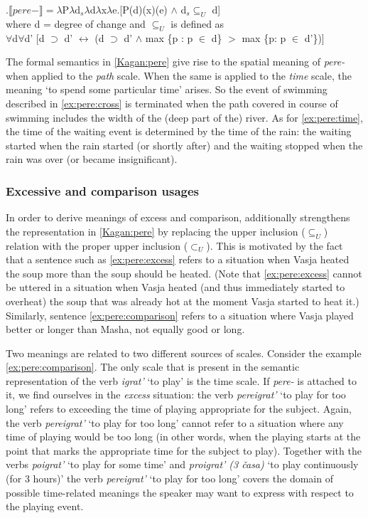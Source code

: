\ex.\label{Kagan:pere}$\llbracket pere- \rrbracket = \lambda$P$\lambda$d$_s\lambda$d$\lambda$x$\lambda$e.[P(d)(x)(e) $\wedge$ d$_s \subseteq _U$ d]\\
where d = degree of change \citep{KennedyLevin:02} and $\subseteq _U$ is defined as\\
$\forall$d$\forall$d' [d $\supset$ d' $\leftrightarrow$ (d $\supset$ d' $\wedge$ max \{p : p $\in$ d\} $>$ max \{p: p $\in$ d'\})]\\

The formal semantics in \ref{Kagan:pere} give rise to the spatial meaning of \textit{pere-} when applied to the \textit{path} scale. When the same is applied to the \textit{time} scale, the meaning `to spend some particular time' arises. So the event of swimming described in \ref{ex:pere:cross} is terminated when the path covered in course of swimming includes the width of the (deep part of the) river. As for \ref{ex:pere:time}, the time of the waiting event is determined by the time of the rain: the waiting started when the rain started (or shortly after) and the waiting stopped when the rain was over (or became insignificant).

\subsubsection{Excessive and comparison usages}
In order to derive meanings of excess and comparison, \citet[133]{Kagan:book} additionally strengthens the representation in \ref{Kagan:pere} by replacing the upper inclusion ($\subseteq _U$) relation with the proper upper inclusion ($\subset _U$). This is motivated by the fact that a sentence such as \ref{ex:pere:excess} refers to a situation when Vasja heated the soup more than the soup should be heated. (Note that \ref{ex:pere:excess} cannot be uttered in a situation when Vasja heated (and thus immediately started to overheat) the soup that was already hot at the moment Vasja started to heat it.) Similarly, sentence \ref{ex:pere:comparison} refers to a situation where Vasja played better or longer than Masha, not equally good or long.

Two meanings are related to two different sources of scales. Consider the example \ref{ex:pere:comparison}. The only scale that is present in the semantic representation of the verb \textit{igrat'} `to play' is the time scale. If \textit{pere-} is attached to it, we find ourselves in the \textit{excess} situation: the verb \textit{pereigrat'} `to play for too long' refers to exceeding the time of playing appropriate for the subject. Again, the verb \textit{pereigrat'} `to play for too long' cannot refer to a situation where any time of playing would be too long (in other words, when the playing starts at the point that marks the appropriate time for the subject to play). Together with the verbs \textit{poigrat'} `to play for some time' and \textit{proigrat' (3 \v{c}asa)} `to play continuously (for 3 hours)' the verb \textit{pereigrat'} `to play for too long' covers the domain of possible time-related meanings the speaker may want to express with respect to the playing event.

